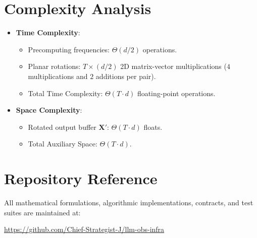 \documentclass[11pt,a4paper]{article}
\theoremstyle{definition}
\begin{document}
\section{Complexity Analysis}
\begin{itemize}
    \item \textbf{Time Complexity}:
    \begin{itemize}
        \item Precomputing frequencies: $\Theta(d/2)$ operations.
        \item Planar rotations: $T \times (d/2)$ 2D matrix-vector multiplications ($4$ multiplications and $2$ additions per pair).
        \item Total Time Complexity: $\Theta(T \cdot d)$ floating-point operations.
    \end{itemize}
    \item \textbf{Space Complexity}:
    \begin{itemize}
        \item Rotated output buffer $\mathbf{X}'$: $\Theta(T \cdot d)$ floats.
        \item Total Auxiliary Space: $\Theta(T \cdot d)$.
    \end{itemize}
\end{itemize}

\section{Repository Reference}
All mathematical formulations, algorithmic implementations, contracts, and test suites are maintained at:
\begin{center}
\url{https://github.com/Chief-Strategist-J/llm-obs-infra}
\end{center}
\end{document}
